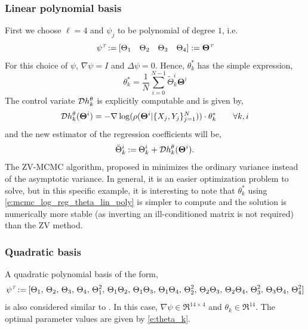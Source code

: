 \noindent \subsubsection*{Linear polynomial basis}
First we choose $\ell=4$ and $\psi_j$ to be polynomial of degree $1$, i.e.
\begin{equation}
\psi^\transpose \eqdef [ \Theta_1 \quad \Theta_2 \quad \Theta_3 \quad \Theta_4] := \boldsymbol{\Theta}^\transpose
\label{e:mcmc_log_reg_linear}
\end{equation}
For this choice of $\psi$,  $\nabla \psi = I$ and $ \Delta \psi = 0$. Hence, $\theta^*_k$ has the simple expression,
\begin{equation}
\theta^*_k = \frac{1}{N} \sum_{i=0}^{N-1} \tilde{\Theta}_k^i \boldsymbol{\Theta}^i
\label{e:mcmc_log_reg_theta_lin_poly}
\end{equation}
The control variate ${\cal D} h^\theta_k$ is explicitly computable and is given by,
\[
{\cal D} h^\theta_k(\boldsymbol{\Theta}^i) = -\nabla \log(\rho(\boldsymbol{\Theta}^i|\{X_j,Y_j\}_{j=1}^N)) \cdot \theta^*_k \qquad \forall k, i
\]
and the new estimator of the regression coefficients will be,
\[
\bar{\Theta}^i_k \mathbin{:=} \Theta^i_k + {\cal D} h^\theta_k(\boldsymbol{\Theta}^i).
\]
The ZV-MCMC algorithm, proposed in \cite{papmirgir14} minimizes the ordinary variance instead of the asymptotic variance. In general, it is an easier optimization problem to solve, but in this specific example, it is interesting to note that $\theta_k^*$  using \eqref{e:mcmc_log_reg_theta_lin_poly} is simpler to compute and the solution is numerically more stable (as inverting an ill-conditioned matrix is not required) than the ZV method.
\noindent \subsubsection*{Quadratic basis}
A quadratic polynomial basis of the form,
\begin{equation}
\psi^\transpose \eqdef [\Theta_1, \, \Theta_2, \, \Theta_3, \, \Theta_4, \, \Theta_1^2, \, \Theta_1 \Theta_2, \, \Theta_1\Theta_3, \, \Theta_1 \Theta_4, \, \Theta_2^2, \, \Theta_2\Theta_3, \, \Theta_2\Theta_4, \, \Theta_3^2, \, \Theta_3 \Theta_4, \, \Theta_4^2] 
\label{e:mcmc_log_reg_quadratic}
\end{equation}
is also considered similar to \cite{papmirgir14}.  In this case, $\nabla \psi \in \Re^{14 \times 4}$ and $\theta_k \in \Re^{14}$. The optimal parameter values are given by \eqref{e:theta_k}.

